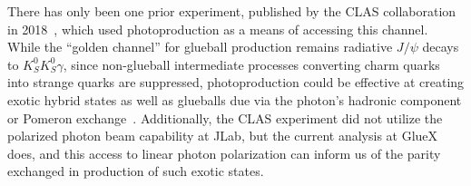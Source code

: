 There has only been one prior experiment, published by the CLAS collaboration in 2018~\cite{the_clas_collaboration_double_2018}, which used photoproduction as a means of accessing this channel. While the ``golden channel'' for glueball production remains radiative $J/\psi$ decays to $K_S^0K_S^0\gamma$, since non-glueball intermediate processes converting charm quarks into strange quarks are suppressed, photoproduction could be effective at creating exotic hybrid states as well as glueballs due via the photon's hadronic component or Pomeron exchange~\cite{mathieu_physics_2009}. Additionally, the CLAS experiment did not utilize the polarized photon beam capability at JLab, but the current analysis at GlueX does, and this access to linear photon polarization can inform us of the parity exchanged in production of such exotic states.

